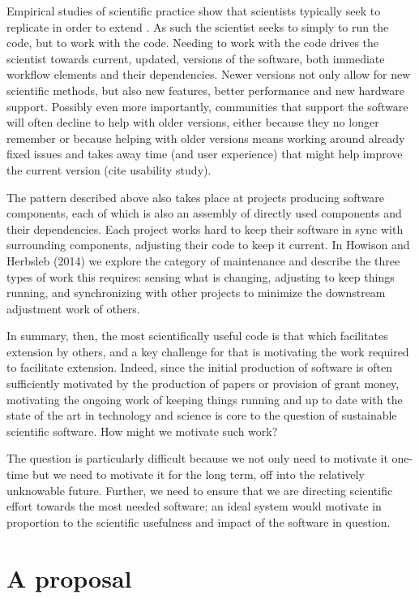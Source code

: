 \documentclass{sigchi}
\begin{document}
Empirical studies of scientific practice show that scientists typically seek to replicate in order to extend . As such the scientist seeks to simply to run the code, but to work with the code. Needing to work with the code drives the scientist towards current, updated, versions of the software, both immediate workflow elements and their dependencies. Newer versions not only allow for new scientific methods, but also new features, better performance and new hardware support. Possibly even more importantly, communities that support the software will often decline to help with older versions, either because they no longer remember or because helping with older versions means working around already fixed issues and takes away time (and user experience) that might help improve the current version (cite usability study). 

The pattern described above also takes place at projects producing software components, each of which is also an assembly of directly used components and their dependencies. Each project works hard to keep their software in sync with surrounding components, adjusting their code to keep it current. In Howison and Herbsleb (2014)\cite{howison_sustainability} we explore the category of maintenance and describe the three types of work this requires: sensing what is changing, adjusting to keep things running, and synchronizing with other projects to minimize the downstream adjustment work of others.

In summary, then, the most scientifically useful code is that which facilitates extension by others, and a key challenge for that is motivating the work required to facilitate extension. Indeed, since the initial production of software is often sufficiently motivated by the production of papers or provision of grant money, motivating the ongoing work of keeping things running and up to date with the state of the art in technology and science is core to the question of sustainable scientific software.  How might we motivate such work?

The question is particularly difficult because we not only need to motivate it one-time but we need to motivate it for the long term, off into the relatively unknowable future. Further, we need to ensure that we are directing scientific effort towards the most needed software; an ideal system would motivate in proportion to the scientific usefulness and impact of the software in question.

\section{A proposal}
\end{document}
